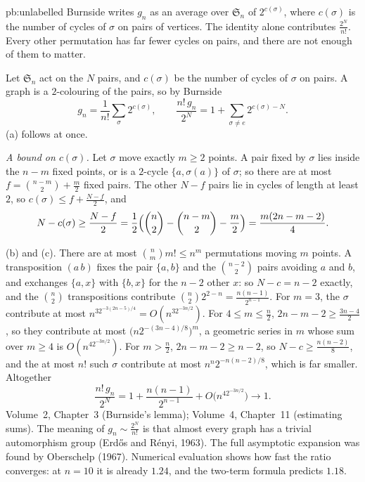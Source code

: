 \begin{solution}{pb:unlabelled}
\idea Burnside writes $g_n$ as an average over $\mathfrak S_n$ of $2^{c(\sigma)}$, where $c(\sigma)$ is the number of cycles of
$\sigma$ on pairs of vertices. The identity alone contributes $\frac{2^N}{n!}$. Every other permutation has far fewer cycles on
pairs, and there are not enough of them to matter.

\writeup Let $\mathfrak S_n$ act on the $N$ pairs, and $c(\sigma)$ be the number of cycles of $\sigma$ on pairs. A graph is a
$2$-colouring of the pairs, so by Burnside
\[
g_n=\frac1{n!}\sum_\sigma2^{c(\sigma)},\qquad\frac{n!\,g_n}{2^N}=1+\sum_{\sigma\ne e}2^{c(\sigma)-N}.
\]
(a) follows at once.

\emph{A bound on $c(\sigma)$.} Let $\sigma$ move exactly $m\ge2$ points. A pair fixed by $\sigma$ lies inside the $n-m$ fixed
points, or is a $2$-cycle $\{a,\sigma(a)\}$ of $\sigma$; so there are at most $f=\binom{n-m}2+\frac m2$ fixed pairs. The other
$N-f$ pairs lie in cycles of length at least $2$, so $c(\sigma)\le f+\frac{N-f}2$, and
\[
N-c(\sigma)\ge\frac{N-f}2=\frac12\Bigl(\binom n2-\binom{n-m}2-\frac m2\Bigr)=\frac{m(2n-m-2)}4.
\]

(b) and (c). There are at most $\binom nm m!\le n^m$ permutations moving $m$ points. A transposition $(a\,b)$ fixes the pair
$\{a,b\}$ and the $\binom{n-2}2$ pairs avoiding $a$ and $b$, and exchanges $\{a,x\}$ with $\{b,x\}$ for the $n-2$ other $x$: so
$N-c=n-2$ exactly, and the $\binom n2$ transpositions contribute $\binom n22^{2-n}=\frac{n(n-1)}{2^{n-1}}$. For $m=3$, the $\sigma$ contribute at most
$n^32^{-3(2n-5)/4}=O(n^32^{-3n/2})$. For $4\le m\le\frac n2$, $2n-m-2\ge\frac{3n-4}2$, so they contribute at most
$\bigl(n2^{-(3n-4)/8}\bigr)^m$, a geometric series in $m$ whose sum over $m\ge4$ is $O(n^42^{-3n/2})$. For $m>\frac n2$, $2n-m-2\ge n-2$, so $N-c\ge\frac{n(n-2)}8$,
and the at most $n!$ such $\sigma$ contribute at most $n^n2^{-n(n-2)/8}$, which is far smaller. Altogether
\[
\frac{n!\,g_n}{2^N}=1+\frac{n(n-1)}{2^{n-1}}+O\bigl(n^42^{-3n/2}\bigr)\longrightarrow1.
\]
\tools Volume~2, Chapter~3 (Burnside's lemma); Volume~4, Chapter~11 (estimating sums).
\leads The meaning of $g_n\sim\frac{2^N}{n!}$ is that almost every graph has a trivial automorphism group (Erdős and Rényi,
1963). The full asymptotic expansion was found by Oberschelp (1967). Numerical evaluation shows how fast the ratio converges: at $n=10$ it is
already $1.24$, and the two-term formula predicts $1.18$.
\end{solution}


